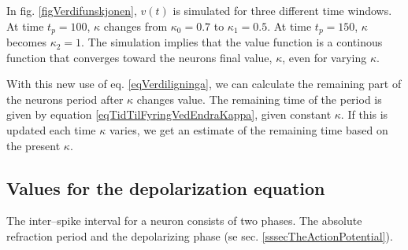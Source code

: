 In fig. \ref{figVerdifunskjonen}, $v(t)$ is simulated for three different time windows. At time $t_p=100$, $\kappa$ changes from $\kappa_0=0.7$ to $\kappa_1=0.5$. At time $t_p=150$, $\kappa$ becomes $\kappa_2=1$. 
The simulation implies that the value function is a continous function that converges toward the neurons final value, $\kappa$, even for varying $\kappa$.


With this new use of eq. \eqref{eqVerdiligninga}, we can calculate the remaining part of the neurons period after $\kappa$ changes value. 
The remaining time of the period is given by equation \eqref{eqTidTilFyringVedEndraKappa}, given constant $\kappa$. 
If this is updated each time $\kappa$ varies, we get an estimate of the remaining time based on the present $\kappa$.






\subsection{Values for the depolarization equation}
\label{sssecValueOfAlpha}


The inter--spike interval for a neuron consists of two phases. 
The absolute refraction period and the depolarizing phase (se sec. \ref{sssecTheActionPotential}).

